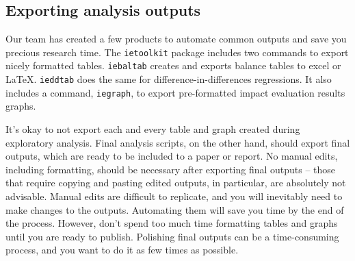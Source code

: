 \subsection{Exporting analysis outputs}

Our team has created a few products to automate common outputs and save you
precious research time.
The \texttt{ietoolkit} package includes two commands to export nicely formatted tables.
\texttt{iebaltab}
creates and exports balance tables to excel or {\LaTeX}.
\texttt{ieddtab}
does the same for difference-in-differences regressions.
It also includes a command, \texttt{iegraph},
to export pre-formatted impact evaluation results graphs.

It's okay to not export each and every table and graph created during exploratory analysis.
Final analysis scripts, on the other hand, should export final outputs,
which are ready to be included to a paper or report.
No manual edits, including formatting, should be necessary after exporting final outputs --
those that require copying and pasting edited outputs,
in particular, are absolutely not advisable.
Manual edits are difficult to replicate,
and you will inevitably need to make changes to the outputs.
Automating them will save you time by the end of the process.
However, don't spend too much time formatting tables and graphs until you are ready to publish.
Polishing final outputs can be a time-consuming process,
and you want to do it as few times as possible.

